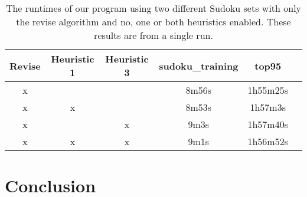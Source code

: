 \documentclass[11pt]{article} %
\begin{document}
\begin{table}
\begin{center}
\begin{tabular}{c c c c c c}
\hline
 Revise & Heuristic 1 & Heuristic 3 & sudoku\_training & top95 \\
\hline
x &  &  & 8m56s & 1h55m25s \\ %
x & x &  & 8m53s & 1h57m3s \\ %
x &  & x & 9m3s & 1h57m40s \\ %
x & x & x & 9m1s & 1h56m52s \\ %
\hline
\end{tabular}
\end{center}
\caption{The runtimes of our program using two different Sudoku sets with only the revise algorithm and no, one or both heuristics enabled. These results are from a single run.}
\end{table}

\section{Conclusion}
\end{document}
